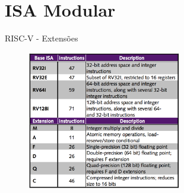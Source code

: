 \documentclass[aspectratio=169]{beamer}
\begin{document}
\section{ISA Modular}
\begin{frame}{RISC-V - Extensões}
	\begin{figure}
		\centering
		\label{fig:bi}
		\includegraphics[width=0.6\textwidth]{img/base-instruction.png}
	\end{figure}
\end{frame}
\end{document}
